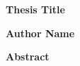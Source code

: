 \thispagestyle{plain}
\begin{center}
    \vspace*{1cm}

    \Large
    \textbf{Thesis Title}
    
    \vspace{0.4cm}
    \large
    \thesisSubTitle   
     
    \vspace{0.4cm}
    \textbf{Author Name}
    
    \vspace{0.9cm}
    \textbf{Abstract}
\end{center}

\lipsum[1-3]